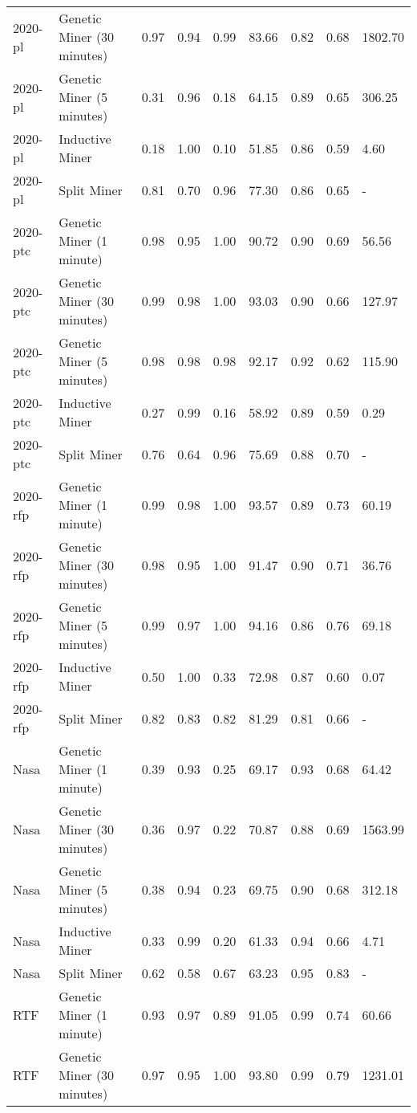 \begin{tabular}{llrrrrrrl}
2020-pl & Genetic Miner (30 minutes) & 0.97 & 0.94 & 0.99 & 83.66 & 0.82 & 0.68 & 1802.70 \\
2020-pl & Genetic Miner (5 minutes) & 0.31 & 0.96 & 0.18 & 64.15 & 0.89 & 0.65 & 306.25 \\
2020-pl & Inductive Miner & 0.18 & 1.00 & 0.10 & 51.85 & 0.86 & 0.59 & 4.60 \\
2020-pl & Split Miner & 0.81 & 0.70 & 0.96 & 77.30 & 0.86 & 0.65 & - \\
2020-ptc & Genetic Miner (1 minute) & 0.98 & 0.95 & 1.00 & 90.72 & 0.90 & 0.69 & 56.56 \\
2020-ptc & Genetic Miner (30 minutes) & 0.99 & 0.98 & 1.00 & 93.03 & 0.90 & 0.66 & 127.97 \\
2020-ptc & Genetic Miner (5 minutes) & 0.98 & 0.98 & 0.98 & 92.17 & 0.92 & 0.62 & 115.90 \\
2020-ptc & Inductive Miner & 0.27 & 0.99 & 0.16 & 58.92 & 0.89 & 0.59 & 0.29 \\
2020-ptc & Split Miner & 0.76 & 0.64 & 0.96 & 75.69 & 0.88 & 0.70 & - \\
2020-rfp & Genetic Miner (1 minute) & 0.99 & 0.98 & 1.00 & 93.57 & 0.89 & 0.73 & 60.19 \\
2020-rfp & Genetic Miner (30 minutes) & 0.98 & 0.95 & 1.00 & 91.47 & 0.90 & 0.71 & 36.76 \\
2020-rfp & Genetic Miner (5 minutes) & 0.99 & 0.97 & 1.00 & 94.16 & 0.86 & 0.76 & 69.18 \\
2020-rfp & Inductive Miner & 0.50 & 1.00 & 0.33 & 72.98 & 0.87 & 0.60 & 0.07 \\
2020-rfp & Split Miner & 0.82 & 0.83 & 0.82 & 81.29 & 0.81 & 0.66 & - \\
Nasa & Genetic Miner (1 minute) & 0.39 & 0.93 & 0.25 & 69.17 & 0.93 & 0.68 & 64.42 \\
Nasa & Genetic Miner (30 minutes) & 0.36 & 0.97 & 0.22 & 70.87 & 0.88 & 0.69 & 1563.99 \\
Nasa & Genetic Miner (5 minutes) & 0.38 & 0.94 & 0.23 & 69.75 & 0.90 & 0.68 & 312.18 \\
Nasa & Inductive Miner & 0.33 & 0.99 & 0.20 & 61.33 & 0.94 & 0.66 & 4.71 \\
Nasa & Split Miner & 0.62 & 0.58 & 0.67 & 63.23 & 0.95 & 0.83 & - \\
RTF & Genetic Miner (1 minute) & 0.93 & 0.97 & 0.89 & 91.05 & 0.99 & 0.74 & 60.66 \\
RTF & Genetic Miner (30 minutes) & 0.97 & 0.95 & 1.00 & 93.80 & 0.99 & 0.79 & 1231.01 \\

\end{tabular}

